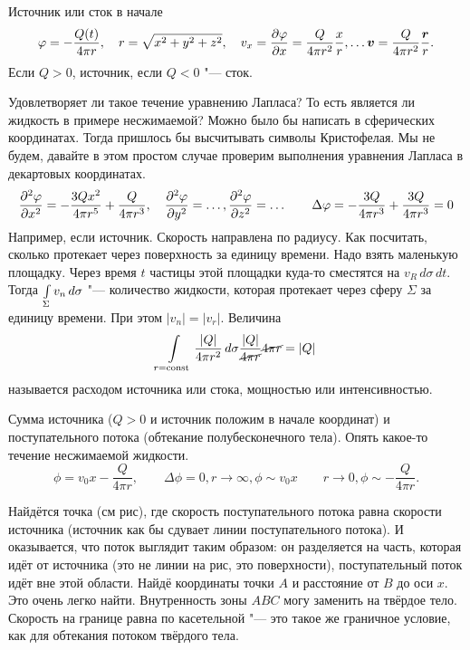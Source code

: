 \begin{Exa}
  Источник или сток в начале
\[
  \varphi = -\frac{Q(t)}{4\pi r},\quad r = \sqrt{x^2+y^2+z^2},\quad v_x = \frac{\partial \varphi}{\partial x} = \frac Q{4\pi r^2}\frac xr,\dots \boldsymbol{v} = \frac{Q}{4\pi r^2}\frac{\boldsymbol{r}}r.
\]
Если $Q>0$, источник, если $Q<0$ "--- сток.
\end{Exa}

Удовлетворяет ли такое течение уравнению Лапласа? То есть является ли жидкость в примере несжимаемой? Можно было бы написать в сферических координатах. Тогда пришлось бы высчитывать символы Кристофелая. Мы не будем, давайте в этом простом случае проверим выполнения уравнения Лапласа в декартовых координатах.
\[
  \frac{\partial ^2\varphi}{\partial x^2} = -\frac{3 Q x^2}{4\pi r^5} + \frac Q{4\pi r^3},\quad   \frac{\partial ^2\varphi}{\partial y^2} = \dots, \frac{\partial ^2\varphi}{\partial z^2} = \dots\qquad \Delta \varphi = -\frac{3 Q}{4\pi r^3} + \frac{3 Q}{4\pi r^3} = 0
\]
Например, если источник. Скорость направлена по радиусу.
Как посчитать, сколько протекает через поверхность за единицу времени. Надо взять маленькую площадку. Через время $t$ частицы этой площадки куда-то сместятся на
$v_R\,d\sigma\,dt$. Тогда $ \int\limits_{\Sigma} v_n\,d\sigma$ "--- количество жидкости, которая протекает через сферу $\Sigma$ за единицу времени. При этом $|v_n| = |v_r|$. Величина
\[
  \int\limits_{r=\operatorname{const}}\frac{|Q|}{4\pi r^2}\,d\sigma\frac{|Q|}{\cancel{4\pi r}}\cancel{4\pi r} = |Q|
\]
называется расходом источника или стока, мощностью или интенсивностью.


\begin{Exa}
  Сумма источника ($Q>0$ и источник положим в начале координат) и поступательного потока (обтекание полубесконечного тела).
Опять какое-то течение несжимаемой жидкости.
\[
  \phi = v_0 x- \frac Q{4\pi r},\qquad \Delta \phi = 0, r\to \infty,\phi\sim v_0 x\qquad r\to 0,\phi\sim -\frac Q{4\pi r}.
\]
\end{Exa}
Найдётся точка (см рис), где скорость поступательного потока равна скорости источника (источник как бы сдувает линии поступательного потока). И оказывается, что поток выглядит таким образом: он разделяется на часть, которая идёт от источника (это не линии на рис, это поверхности), поступательный поток идёт вне этой области. Найдё координаты точки $A$ и расстояние от $B$ до оси $x$. Это очень легко найти. Внутренность зоны $ABC$ могу заменить на твёрдое тело. Скорость на границе равна по касетельной "--- это такое же граничное условие, как для обтекания потоком твёрдого тела.

